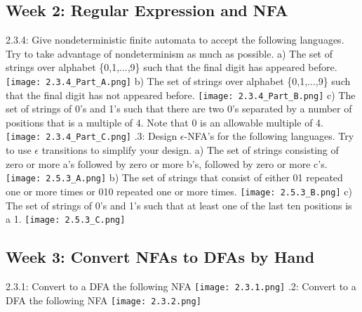 \documentclass{article}
\theoremstyle{theorem}
\theoremstyle{definition}
\theoremstyle{remark}
\begin{document}
\subsection{Week 2: Regular Expression and NFA}
2.3.4: Give nondeterministic finite automata to accept the following languages. Try to take advantage of nondeterminism as much as possible. 
\newline \indent a) The set of strings over alphabet \{0,1,...,9\} such that the final digit has appeared before. 
\newline \indent \texttt{[image: 2.3.4\_Part\_A.png]}
\newline \indent b) The set of strings over alphabet \{0,1,...,9\} such that the final digit has not appeared before.
\newline \indent \texttt{[image: 2.3.4\_Part\_B.png]}
\newline \indent c) The set of strings of 0's and 1's such that there are two 0's separated by a number of positions that is a multiple of 4. Note that 0 is an allowable multiple of 4.
\newline \indent \texttt{[image: 2.3.4\_Part\_C.png]}
.3: Design  $\epsilon$-NFA's for the following languages. Try to use $\epsilon$ transitions to simplify your design. 
\newline \indent a) The set of strings consisting of zero or more a's followed by zero or more b's, followed by zero or more c's. 
\newline \indent \texttt{[image: 2.5.3\_A.png]}
\newline \indent b) The set of strings that consist of either 01 repeated one or more times or 010 repeated one or more times. 
\newline \indent \texttt{[image: 2.5.3\_B.png]}
\newline \indent c) The set of strings of 0's and 1's such that at least one of the last ten positions is a 1. 
\newline \indent \texttt{[image: 2.5.3\_C.png]}

\subsection{Week 3: Convert NFAs to DFAs by Hand}
2.3.1: Convert to a DFA the following NFA
\newline \indent \texttt{[image: 2.3.1.png]}
.2: Convert to a DFA the following NFA
\newline \indent \texttt{[image: 2.3.2.png]}
\end{document}
